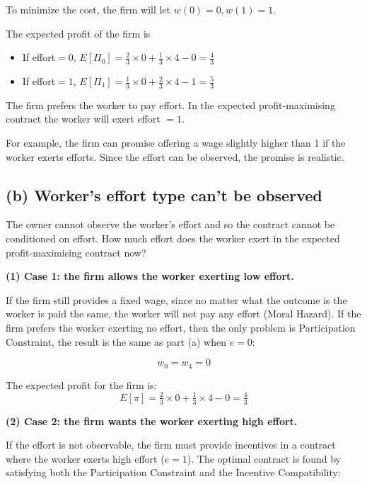 \documentclass{article}
\begin{document}
To minimize the cost, the firm will let $w(0) = 0,  w(1) = 1$.

\medskip

The expected profit of the firm is 
\begin{itemize}
\item If effort$=0$, $E[\Pi_0]= \tfrac23 \times 0 + \tfrac13 \times 4 - 0 =\tfrac43$
\item If effort$=1$, $E[\Pi_1]= \tfrac13 \times 0 + \tfrac23 \times 4 - 1 =\tfrac53$
\end{itemize}

The firm prefers the worker to pay effort. In the expected
profit-maximising contract the worker will exert effort $=1$.

\begin{mdframed}[backgroundcolor=blue!20,linecolor=white]
For example, the firm can promise offering a wage slightly higher than 1 if the worker exerts efforts. Since the effort can be observed, the promise is realistic.
\end{mdframed}

\subsection*{(b) Worker's effort type can't be observed}
The owner cannot observe the worker's effort and so the contract cannot be conditioned on
effort. How much effort does the worker exert in the expected profit-maximising contract now?

\bigskip

\textbf{(1) Case 1: the firm allows the worker exerting low effort.}

\medskip

If the firm still provides a fixed wage, since no matter what the outcome is the worker is paid the same, the worker will not pay any effort (Moral Hazard). If the firm prefers the worker exerting no effort, then the only problem is Participation Constraint, the result is the same as part (a) when $e=0$:

$$w_0 = w_4 = 0$$

The expected profit for the firm is: $$E[\pi]= \tfrac23 \times 0 + \tfrac13 \times 4 - 0 =\tfrac43$$

\medskip

\textbf{(2) Case 2: the firm wants the worker exerting high effort.}

\medskip

If the effort is not observable, the firm must provide incentives in a contract where the worker exerts high effort ($e=1$). The optimal contract is found by satisfying both the Participation Constraint and the Incentive Compatibility:
\end{document}
